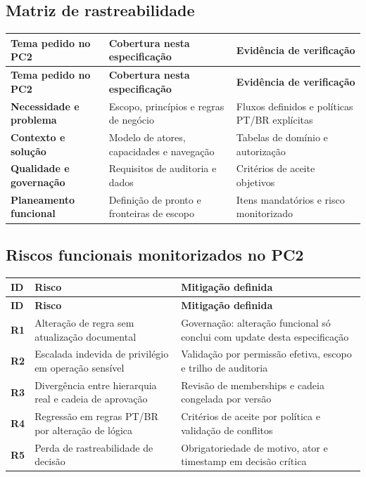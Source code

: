 \documentclass[11pt,a4paper,twoside]{article}
\newcommand{\tH}[1]{\textbf{\sffamily\small\color{white}#1}}
\newcommand{\theadrow}{\rowcolor{ACCENT}}
\begin{document}
\subsection{Matriz de rastreabilidade}
\begin{longtable}{>{\small\bfseries}p{4.0cm} >{\small}p{4.7cm} >{\small}p{4.8cm}}
\theadrow
\tH{Tema pedido no PC2} & \tH{Cobertura nesta especificação} & \tH{Evidência de verificação} \\
\midrule
\endfirsthead
\theadrow
\tH{Tema pedido no PC2} & \tH{Cobertura nesta especificação} & \tH{Evidência de verificação} \\
\midrule
\endhead
Necessidade e problema & Escopo, princípios e regras de negócio & Fluxos definidos e políticas PT/BR explícitas \\
Contexto e solução & Modelo de atores, capacidades e navegação & Tabelas de domínio e autorização \\
Qualidade e governação & Requisitos de auditoria e dados & Critérios de aceite objetivos \\
Planeamento funcional & Definição de pronto e fronteiras de escopo & Itens mandatórios e risco monitorizado \\
\bottomrule
\end{longtable}

\subsection{Riscos funcionais monitorizados no PC2}
\begin{longtable}{>{\small\bfseries\centering\arraybackslash}p{0.9cm} >{\small}p{6.2cm} >{\small}p{6.0cm}}
\theadrow
\tH{ID} & \tH{Risco} & \tH{Mitigação definida} \\
\midrule
\endfirsthead
\theadrow
\tH{ID} & \tH{Risco} & \tH{Mitigação definida} \\
\midrule
\endhead
R1 & Alteração de regra sem atualização documental & Governação: alteração funcional só conclui com update desta especificação \\
R2 & Escalada indevida de privilégio em operação sensível & Validação por permissão efetiva, escopo e trilho de auditoria \\
R3 & Divergência entre hierarquia real e cadeia de aprovação & Revisão de memberships e cadeia congelada por versão \\
R4 & Regressão em regras PT/BR por alteração de lógica & Critérios de aceite por política e validação de conflitos \\
R5 & Perda de rastreabilidade de decisão & Obrigatoriedade de motivo, ator e timestamp em decisão crítica \\
\bottomrule
\end{longtable}
\end{document}
